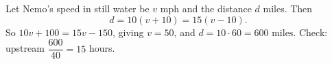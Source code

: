 Let Nemo's speed in still water be $v$ mph and the distance $d$ miles. Then
\[
d=10(v+10)=15(v-10).
\]
So $10v+100=15v-150$, giving $v=50$, and $d=10\cdot60=\boxed{600\text{ miles}}$. Check: upstream $\dfrac{600}{40}=15$ hours.
